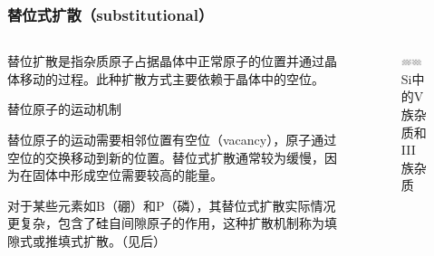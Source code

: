 \documentclass[xcolor=table,dvipsnames,svgnames,aspectratio=169]{ctexbeamer}
\begin{document}
\begin{frame}
  \frametitle{替位式扩散（substitutional）}

  \begin{columns}
    \begin{column}{0.7\textwidth}
      替位扩散是指杂质原子占据晶体中正常原子的位置并通过晶体移动的过程。此种扩散方式主要依赖于晶体中的空位。

      替位原子的运动机制
    
      替位原子的运动需要相邻位置有空位（vacancy），原子通过空位的交换移动到新的位置。替位式扩散通常较为缓慢，因为在固体中形成空位需要较高的能量。
    
      对于某些元素如B（硼）和P（磷），其替位式扩散实际情况更复杂，包含了硅自间隙原子的作用，这种扩散机制称为填隙式或推填式扩散。（见后）
    \end{column}
    \begin{column}{0.3\textwidth}
      \begin{figure}
        \centering
        \includegraphics[width=0.8\textwidth]{Si中的V族杂质和III族杂质.png}
        \caption{Si中的V族杂质和III族杂质}
      \end{figure}
    \end{column}
  \end{columns}

\end{frame}
\end{document}
